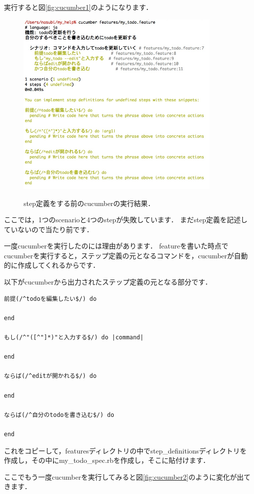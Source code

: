 実行すると図\ref{fig:cucumber1}のようになります．

\begin{figure}[htbp]\begin{center}
\includegraphics[width=10cm,bb= 0 0 737 553]{../figs/./cucumber1.jpg}
\caption{step定義をする前のcucumberの実行結果．}
\label{fig:cucumber1}
\label{default}\end{center}\end{figure}
ここでは，1つのscenarioと4つのstepが失敗しています．
まだstep定義を記述していないので当たり前です．

一度cucumberを実行したのには理由があります．
featureを書いた時点でcucumberを実行すると，ステップ定義の元となるコマンドを，cucumberが自動的に作成してくれるからです．

以下がcucumberから出力されたステップ定義の元となる部分です．
\begin{lstlisting}[style=customCsh,basicstyle={\scriptsize\ttfamily}]
前提(/^todoを編集したい$/) do

end

もし(/^"([^"]*)"と入力する$/) do |command|

end

ならば(/^editが開かれる$/) do
  
end

ならば(/^自分のtodoを書き込む$/) do

end
\end{lstlisting}
これをコピーして，featuresディレクトリの中でstep\_definitionsディレクトリを作成し，その中にmy\_todo\_spec.rbを作成し，そこに貼付けます．

ここでもう一度cucumberを実行してみると図\ref{fig:cucumber2}のように変化が出てきます．

